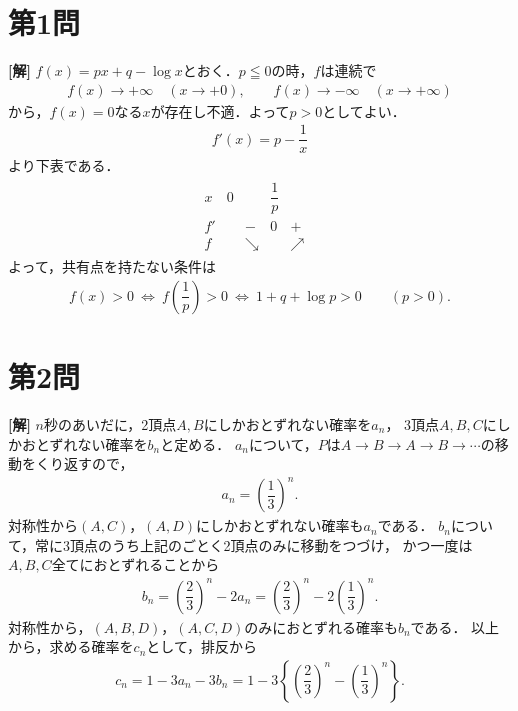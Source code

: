 \documentclass[../main.tex]{subfiles}
\begin{document}
\section*{第1問}

{\bf [解]}
$f(x)=px+q-\log x$とおく．$p\leqq0$の時，$f$は連続で
\begin{align}
  f(x)\longrightarrow+\infty\quad(x\to+0),\qquad
  f(x)\longrightarrow-\infty\quad(x\to+\infty)
\end{align}
から，$f(x)=0$なる$x$が存在し不適．よって$p>0$としてよい．
\begin{align}f'(x)=p-\dfrac{1}{x}
\end{align}
より下表である．
\begin{align}
  \begin{array}{c|ccccc}
    x&0&&\dfrac{1}{p}&&\\\hline
    f'&&-&0&+&\\\hline
    f&&\searrow&&\nearrow&
  \end{array}
\end{align}
よって，共有点を持たない条件は
\begin{align}
  f(x)>0\ \Longleftrightarrow\ f\left(\dfrac{1}{p}\right)>0
  \ \Longleftrightarrow\ 1+q+\log p>0\qquad(p>0).
\end{align}
\newpage

\section*{第2問}

{\bf [解]}
$n$秒のあいだに，2頂点$A,B$にしかおとずれない確率を$a_n$，
3頂点$A,B,C$にしかおとずれない確率を$b_n$と定める．
$a_n$について，$P$は$A\to B\to A\to B\to\cdots$の移動をくり返すので，
\begin{align}a_n=\left(\dfrac{1}{3}\right)^n.\label{eq:ky2008-2-a}
\end{align}
対称性から$(A,C)$，$(A,D)$にしかおとずれない確率も$a_n$である．
$b_n$について，常に3頂点のうち上記のごとく2頂点のみに移動をつづけ，
かつ一度は$A,B,C$全てにおとずれることから
\begin{align}
  b_n=\left(\dfrac{2}{3}\right)^n-2a_n
  =\left(\dfrac{2}{3}\right)^n-2\left(\dfrac{1}{3}\right)^n.
  \label{eq:ky2008-2-b}
\end{align}
対称性から，$(A,B,D)$，$(A,C,D)$のみにおとずれる確率も$b_n$である．
以上から，求める確率を$c_n$として，排反から
\begin{align}
  c_n=1-3a_n-3b_n
  =1-3\left\{\left(\dfrac{2}{3}\right)^n-\left(\dfrac{1}{3}\right)^n\right\}.
\end{align}
\newpage
\end{document}
